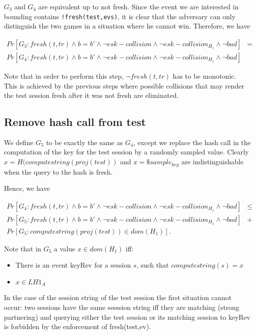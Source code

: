 \documentclass[]{article}
\begin{document}
$G_3$ and $G_4$ are equivalent  up to not fresh. Since the event we are interested in bounding contains \verb+!fresh(test,evs)+, it is clear that the adversary can only distinguish the two games in a situation where he cannot win. Therefore, we have

\begin{align*}
Pr[G_3 : fresh(t,tr) \land b = b' \land \neg esk-collision \land \neg esk-collision_{H_1} \land \neg bad] &=&\\
  Pr[G_4 : fresh(t,tr) \land b = b' \land \neg esk-collision \land \neg esk-collision_{H_1} \land \neg bad] 
\end{align*}

Note that in order to perform this step, $\neg fresh(t,tr)$ has to be monotonic. This is achieved by the previous steps where possible collisions that may render the test session fresh after it was not fresh are eliminated.

\subsection{Remove hash call from test}
We define $G_5$ to be exactly the same as $G_4$, except we replace the hash call in the computation of the key for the test session by a randomly sampled value. Clearly $x = H(computestring(proj(test))$ and $x=\$sample_{key} $ are  indistinguishable when the query to the hash is fresh. 

Hence, we have

\begin{align*}
  Pr[G_4 : fresh(t,tr) \land b = b' \land \neg esk-collision \land \neg esk-collision_{H_1} \land \neg bad]  &\leq&\\ 
  Pr[G_5 : fresh(t,tr) \land b = b' \land \neg esk-collision \land \neg esk-collision_{H_1} \land \neg bad]  &+&\\
  Pr[G_5 : computestring(proj(test)) \in dom(H_1) ]. 
\end{align*}


Note that  in $G_5$ a value $x\in dom(H_1)$ iff:
\begin{itemize}
\item There is an event keyRev for a session $s$, such that $computestring(s) = x$
\item $x \in LH1_{A}$
\end{itemize}

In the case of the session string of the test session the first situation cannot occur: two sessions have the same sesssion string iff they are matching (strong partnering) and querying either the test session or its matching session to keyRev is forbidden by the enforcement of fresh(test,ev).
\end{document}
